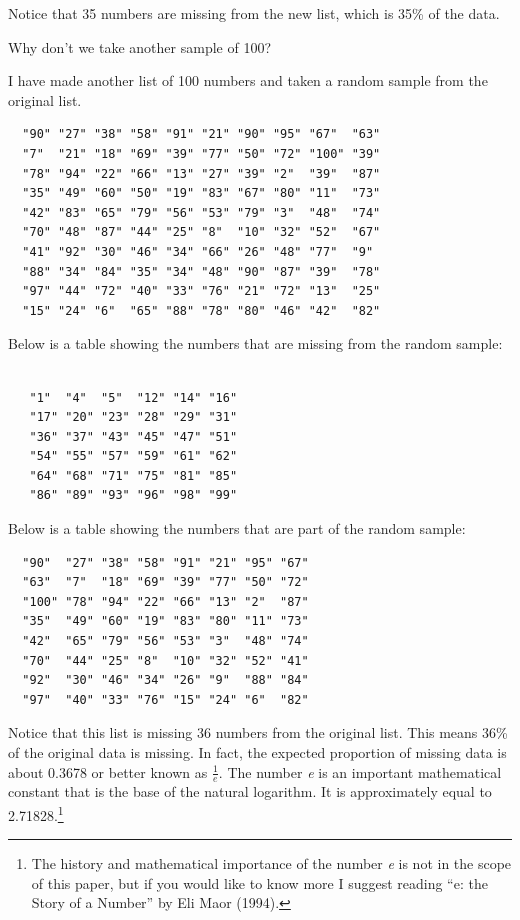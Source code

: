 \documentclass[12pt,twoside]{reedthesis}
\begin{document}
  Notice that 35 numbers are missing from the new list, which is 35\% of
  the data.
  
  Why don't we take another sample of 100?
  
  I have made another list of 100 numbers and taken a random sample from
  the original list.
  
  \begin{verbatim}
  "90" "27" "38" "58" "91" "21" "90" "95" "67"  "63" 
  "7"  "21" "18" "69" "39" "77" "50" "72" "100" "39" 
  "78" "94" "22" "66" "13" "27" "39" "2"  "39"  "87" 
  "35" "49" "60" "50" "19" "83" "67" "80" "11"  "73" 
  "42" "83" "65" "79" "56" "53" "79" "3"  "48"  "74" 
  "70" "48" "87" "44" "25" "8"  "10" "32" "52"  "67" 
  "41" "92" "30" "46" "34" "66" "26" "48" "77"  "9"  
  "88" "34" "84" "35" "34" "48" "90" "87" "39"  "78" 
  "97" "44" "72" "40" "33" "76" "21" "72" "13"  "25" 
  "15" "24" "6"  "65" "88" "78" "80" "46" "42"  "82"
  \end{verbatim}
  
  Below is a table showing the numbers that are missing from the random
  sample:
  
  \begin{verbatim}
  
   "1"  "4"  "5"  "12" "14" "16"
   "17" "20" "23" "28" "29" "31"
   "36" "37" "43" "45" "47" "51"
   "54" "55" "57" "59" "61" "62"
   "64" "68" "71" "75" "81" "85"
   "86" "89" "93" "96" "98" "99"
  \end{verbatim}
  
  \newpage
  
  Below is a table showing the numbers that are part of the random sample:
  
  \begin{verbatim}
  "90"  "27" "38" "58" "91" "21" "95" "67"
  "63"  "7"  "18" "69" "39" "77" "50" "72"
  "100" "78" "94" "22" "66" "13" "2"  "87"
  "35"  "49" "60" "19" "83" "80" "11" "73"
  "42"  "65" "79" "56" "53" "3"  "48" "74"
  "70"  "44" "25" "8"  "10" "32" "52" "41"
  "92"  "30" "46" "34" "26" "9"  "88" "84"
  "97"  "40" "33" "76" "15" "24" "6"  "82"   
  \end{verbatim}
  
  Notice that this list is missing 36 numbers from the original list. This
  means 36\% of the original data is missing. In fact, the expected
  proportion of missing data is about 0.3678 or better known as
  \(\frac{1}{e}\). The number \emph{e} is an important mathematical
  constant that is the base of the natural logarithm. It is approximately
  equal to 2.71828.\footnote{The history and mathematical importance of
    the number \emph{e} is not in the scope of this paper, but if you
    would like to know more I suggest reading ``e: the Story of a Number''
    by Eli Maor (1994).}
  
\end{document}
